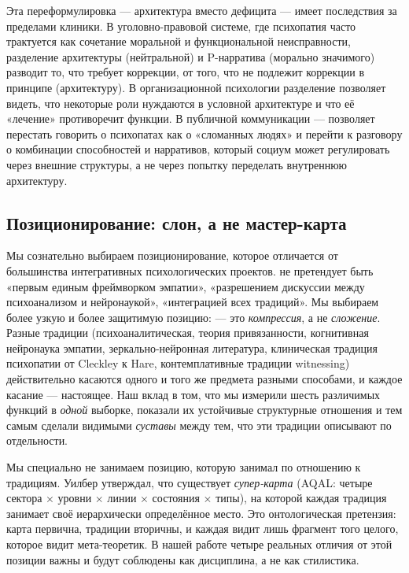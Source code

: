 Эта переформулировка --- архитектура вместо дефицита --- имеет последствия за пределами клиники. В уголовно-правовой системе, где психопатия часто трактуется как сочетание моральной и функциональной неисправности, разделение архитектуры (нейтральной) и P-нарратива (морально значимого) разводит то, что требует коррекции, от того, что не подлежит коррекции в принципе (архитектуру). В организационной психологии разделение позволяет видеть, что некоторые роли нуждаются в условной архитектуре и что её «лечение» противоречит функции. В публичной коммуникации --- позволяет перестать говорить о психопатах как о «сломанных людях» и перейти к разговору о комбинации способностей и нарративов, который социум может регулировать через внешние структуры, а не через попытку переделать внутреннюю архитектуру.

\subsection{Позиционирование: слон, а не мастер-карта}
\label{subsec:positioning}

Мы сознательно выбираем позиционирование, которое отличается от большинства интегративных психологических проектов. \DEIC{} не претендует быть «первым единым фреймворком эмпатии», «разрешением дискуссии между психоанализом и нейронаукой», «интеграцией всех традиций». Мы выбираем более узкую и более защитимую позицию: \DEIC{} --- это \emph{компрессия}, а не \emph{сложение}. Разные традиции (психоаналитическая, теория привязанности, когнитивная нейронаука эмпатии, зеркально-нейронная литература, клиническая традиция психопатии от Cleckley к Hare, контемплативные традиции witnessing) действительно касаются одного и того же предмета разными способами, и каждое касание --- настоящее. Наш вклад в том, что мы измерили шесть различимых функций в \emph{одной} выборке, показали их устойчивые структурные отношения и тем самым сделали видимыми \emph{суставы} между тем, что эти традиции описывают по отдельности.

Мы специально не занимаем позицию, которую \citet{wilber1995, wilber2000} занимал по отношению к традициям. Уилбер утверждал, что существует \emph{супер-карта} (AQAL: четыре сектора $\times$ уровни $\times$ линии $\times$ состояния $\times$ типы), на которой каждая традиция занимает своё иерархически определённое место. Это онтологическая претензия: карта первична, традиции вторичны, и каждая видит лишь фрагмент того целого, которое видит мета-теоретик. В нашей работе четыре реальных отличия от этой позиции важны и будут соблюдены как дисциплина, а не как стилистика.

